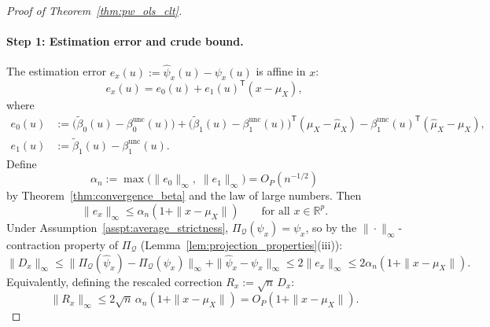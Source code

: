 \documentclass[12pt]{article}
\newcommand{\T}{\mathsf{T}} %
\newcommand{\R}{\mathbb{R}} %
\newcommand{\PiQ}{\Pi_{\mathcal{Q}}} %
\begin{document}
\begin{proof}[Proof of Theorem~\ref{thm:pw_ols_clt}]
\paragraph{Step 1: Estimation error and crude bound.}
The estimation error $e_x(u):=\hat\psi_x(u)-\psi_x(u)$ is affine in $x$:
\[
e_x(u)=e_0(u)+e_1(u)^{\!\T}(x-\mu_X),
\]
where
\begin{align*}
e_0(u)&:=\bigl(\tilde\beta_0(u)-\beta_0^{\mathrm{unc}}(u)\bigr)
  +\bigl(\tilde\beta_1(u)-\beta_1^{\mathrm{unc}}(u)\bigr)^{\!\T}(\mu_X-\hat\mu_X)
  -\beta_1^{\mathrm{unc}}(u)^{\!\T}(\hat\mu_X-\mu_X),\\
e_1(u)&:=\tilde\beta_1(u)-\beta_1^{\mathrm{unc}}(u).
\end{align*}
Define
\[
\alpha_n:=\max\bigl(\|e_0\|_\infty,\;\|e_1\|_\infty\bigr)=O_P(n^{-1/2})
\]
by Theorem~\ref{thm:convergence_beta} and the law of large numbers. Then
\begin{equation}\label{eq:e_bound_pf}
\|e_x\|_\infty\le\alpha_n(1+\|x-\mu_X\|)\qquad\text{for all }x\in\R^p.
\end{equation}
Under Assumption~\ref{asspt:average_strictness}, $\PiQ(\psi_x)=\psi_x$, so by the $\|\cdot\|_\infty$-contraction property of $\PiQ$ (Lemma~\ref{lem:projection_properties}(iii)):
\begin{equation}\label{eq:crude_D_pf}
\|D_x\|_\infty
\le\|\PiQ(\hat\psi_x)-\PiQ(\psi_x)\|_\infty+\|\hat\psi_x-\psi_x\|_\infty
\le 2\|e_x\|_\infty
\le 2\alpha_n(1+\|x-\mu_X\|).
\end{equation}
Equivalently, defining the rescaled correction $R_x:=\sqrt{n}\,D_x$:
\begin{equation}\label{eq:crude_R_pf}
\|R_x\|_\infty\le 2\sqrt{n}\,\alpha_n(1+\|x-\mu_X\|)=O_P(1+\|x-\mu_X\|).
\end{equation}
 

\end{proof}
\end{document}
